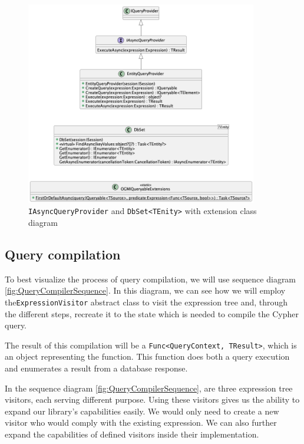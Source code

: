 \begin{figure}[H]
    \centering
    \includegraphics[width=0.9\textwidth]{content/QueryProvider.png}
    \caption{\texttt{IAsyncQueryProvider} and \texttt{DbSet<TEnity>} with extension class diagram}
    \label{fig:queryprovider}
\end{figure}

\subsection{Query compilation}

To best visualize the process of query compilation, we will use sequence
diagram \ref{fig:QueryCompilerSequence}. In this diagram, we can see how we will employ
the\linebreak\texttt{ExpressionVisitor} abstract class to visit the expression tree and, through the different steps, recreate it to the state which is needed to compile the Cypher query.

The result of this compilation will be a \texttt{Func<QueryContext, TResult>}, which is an object representing the function.
This function does both a query execution and enumerates a result from a database response.

In the sequence diagram \ref{fig:QueryCompilerSequence}, are three expression tree visitors, each serving different purpose. Using these visitors
gives us the ability to expand our library's capabilities easily. We would only need to create a new visitor who would comply with
the existing expression. We can also further expand the capabilities of defined visitors inside their implementation.

